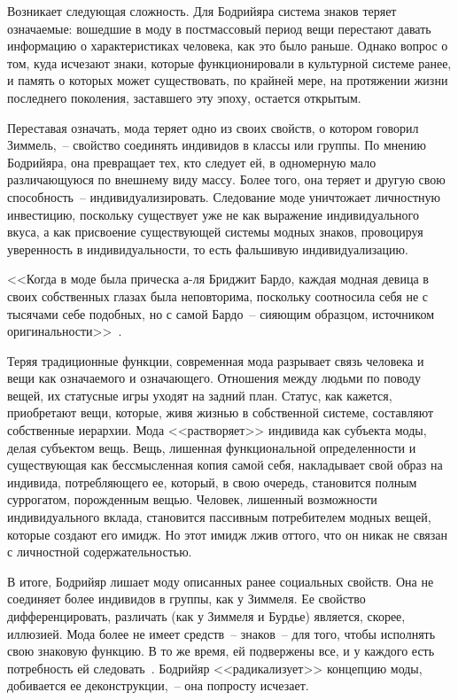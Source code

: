   Возникает следующая сложность. Для Бодрийяра система знаков теряет означаемые:
  вошедшие в моду в постмассовый период вещи перестают давать информацию о
  характеристиках человека, как это было раньше. Однако вопрос о том, куда
  исчезают знаки, которые функционировали в культурной системе ранее, и память о
  которых может существовать, по крайней мере, на протяжении жизни последнего
  поколения, заставшего эту эпоху, остается открытым.
     
  Переставая означать, мода теряет одно из своих свойств, о котором говорил
  Зиммель,~-- свойство соединять индивидов в классы или группы. По мнению
  Бодрийяра, она превращает тех, кто следует ей, в одномерную мало различающуюся
  по внешнему виду массу. Более того, она теряет и другую свою способность~--
  индивидуализировать. Следование моде уничтожает личностную инвестицию,
  поскольку существует уже не как выражение индивидуального вкуса, а как
  присвоение существующей системы модных знаков, провоцируя уверенность в
  индивидуальности, то есть фальшивую индивидуализацию.
  
  <<Когда в моде была прическа а-ля Бриджит Бардо, каждая модная девица в своих
  собственных глазах была неповторима, поскольку соотносила себя не с тысячами
  себе подобных, но с самой Бардо~-- сияющим образцом, источником
  оригинальности>>~\cite{bib:5}.
  
  Теряя традиционные функции, современная мода разрывает связь человека и вещи
  как означаемого и означающего. Отношения между людьми по поводу вещей, их
  статусные игры уходят на задний план. Статус, как кажется, приобретают вещи,
  которые, живя жизнью в собственной системе, составляют собственные иерархии.
  Мода <<растворяет>> индивида как субъекта моды, делая субъектом вещь. Вещь,
  лишенная функциональной определенности и существующая как бессмысленная копия
  самой себя, накладывает свой образ на индивида, потребляющего ее, который, в
  свою очередь, становится полным суррогатом, порожденным вещью. Человек,
  лишенный возможности индивидуального вклада, становится пассивным потребителем
  модных вещей, которые создают его имидж. Но этот имидж лжив оттого, что он
  никак не связан с личностной содержательностью.
  
  В итоге, Бодрийяр лишает моду описанных ранее социальных свойств. Она не
  соединяет более индивидов в группы, как у Зиммеля. Ее свойство
  дифференцировать, различать (как у Зиммеля и Бурдье) является, скорее,
  иллюзией. Мода более не имеет средств~-- знаков~-- для того,
  чтобы исполнять свою знаковую функцию. В то же время, ей подвержены все, и у
  каждого есть потребность ей следовать~\cite{bib:5}. Бодрийяр <<радикализует>>
  концепцию моды, добивается ее деконструкции,~-- она попросту исчезает.

